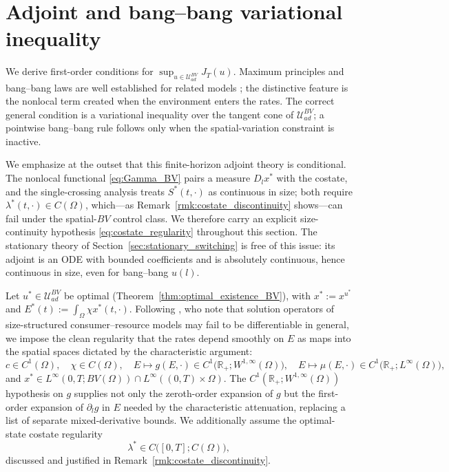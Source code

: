 \documentclass[pdflatex,sn-mathphys-num]{sn-jnl}
\newcommand{\R}{\mathbb{R}}
\newcommand{\Om}{\Omega}
\newcommand{\UadBV}{\mathcal{U}_{ad}^{BV}}
\theoremstyle{plain}
\theoremstyle{definition}
\theoremstyle{remark}
\begin{document}
\section{Adjoint and bang--bang variational inequality}
\label{sec:adjoint}

We derive first-order conditions for $\sup_{u\in\UadBV}J_T(u)$. Maximum principles
and bang--bang laws are well established for related models
\cite{brokate1985pontryagin,kato2008optimal,yu2026from,hritonenko2009bang,anita2019optimal,gao2022rolling}; the distinctive feature is the nonlocal term created when
the environment enters the rates. The correct general condition is a variational
inequality over the tangent cone of $\UadBV$; a pointwise bang--bang rule follows
only when the spatial-variation constraint is inactive.

We emphasize at the outset that this finite-horizon adjoint theory is  conditional. The nonlocal functional
\eqref{eq:Gamma_BV} pairs a measure $D_lx^*$ with the costate, and the
single-crossing analysis treats $S^*(t,\cdot)$ as continuous in size; both require
$\lambda^*(t,\cdot)\in C(\Om)$, which---as Remark~\ref{rmk:costate_discontinuity}
shows---can fail under the spatial-$BV$ control class. We therefore carry an
explicit size-continuity hypothesis \eqref{eq:costate_regularity} throughout this
section. The stationary theory of Section~\ref{sec:stationary_switching} is free
of this issue: its adjoint is an ODE with bounded coefficients and is absolutely
continuous, hence continuous in size, even for bang--bang $u(l)$.

Let $u^*\in\UadBV$ be optimal (Theorem~\ref{thm:optimal_existence_BV}), with
$x^*:=x^{u^*}$ and $E^*(t):=\int_\Om\chi x^*(t,\cdot)$. Following
\cite{diekmann2025age}, who note that solution operators of size-structured
consumer--resource models may fail to be differentiable in general, we impose the
clean regularity that the rates depend smoothly on $E$ as maps into the
spatial spaces dictated by the characteristic argument:
\begin{equation}\label{eq:adjoint_assumptions}
c\in C^1(\Om),
\quad
\chi\in C(\Om),
\quad
E\mapsto g(E,\cdot)\in C^1\big(\R_+;W^{1,\infty}(\Om)\big),
\quad
E\mapsto\mu(E,\cdot)\in C^1\big(\R_+;L^\infty(\Om)\big),
\end{equation}
and $x^*\in L^\infty(0,T;BV(\Om))\cap L^\infty((0,T)\times\Om)$. The
$C^1(\R_+;W^{1,\infty}(\Om))$ hypothesis on $g$ supplies not only the zeroth-order
expansion of $g$ but the first-order expansion of $\partial_lg$ in $E$ needed by
the characteristic attenuation, replacing a list of separate mixed-derivative
bounds. We additionally assume the optimal-state costate regularity
\begin{equation}\label{eq:costate_regularity}
\lambda^*\in C\big([0,T];C(\Om)\big),
\tag{R}
\end{equation}
discussed and justified in Remark~\ref{rmk:costate_discontinuity}.
\end{document}
